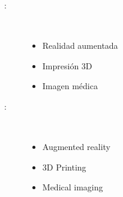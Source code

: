 \begin{multicols}{2}
\begin{description}
\item [\palabraschaveprincipal:] \mbox{} \\[-20pt]
  \begin{itemize}
    \item Realidad aumentada
    \item Impresión 3D
    \item Imagen médica
  \end{itemize} 
\end{description}
\begin{description}
\item [\palabraschavesecundaria:] \mbox{} \\[-20pt]
  \begin{itemize}
    \item Augmented reality
    \item 3D Printing
    \item Medical imaging
  \end{itemize}
\end{description}
\end{multicols}
